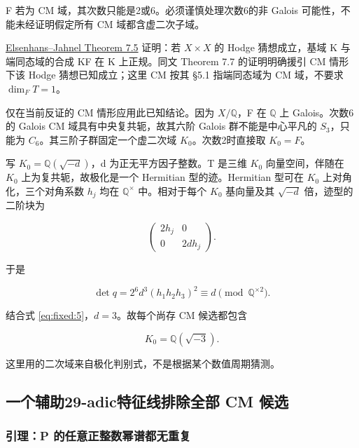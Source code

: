 \documentclass[11pt,a4paper,oneside]{ctexart}
\theoremstyle{cnplain}
\theoremstyle{definition}
\theoremstyle{remark}
\numberwithin{equation}{section}
\begin{document}
F 若为 CM 域，其次数只能是2或6。必须谨慎处理次数6的非 Galois 可能性，不能未经证明假定所有 CM 域都含虚二次子域。

\href{https://wwwuser.gwdguser.de/~jjahnel/Arbeiten/Komponentengruppe_v4f.pdf}{Elsenhans--Jahnel Theorem 7.5} 证明：若 \(X\times X\) 的 Hodge 猜想成立，基域 K 与端同态域的合成 KF 在 K 上正规。同文 Theorem 7.7 的证明明确援引 CM 情形下该 Hodge 猜想已知成立；这里 CM 按其 §5.1 指端同态域为 CM 域，不要求 \(\dim_FT=1\)。

仅在当前反证的 CM 情形应用此已知结论。因为 \(X/\mathbb Q\)，F 在 \(\mathbb Q\) 上 Galois。次数6的 Galois CM 域具有中央复共轭，故其六阶 Galois 群不能是中心平凡的 \(S_3\)，只能为 \(C_6\)。其三阶子群固定一个虚二次域 \(K_0\)。次数2时直接取 \(K_0=F\)。

写 \(K_0=\mathbb Q(\sqrt{-d})\)，d 为正无平方因子整数。T 是三维 \(K_0\) 向量空间，伴随在 \(K_0\) 上为复共轭，故极化是一个 Hermitian 型的迹。Hermitian 型可在 \(K_0\) 上对角化，三个对角系数 \(h_j\) 均在 \(\mathbb Q^\times\) 中。相对于每个 \(K_0\) 基向量及其 \(\sqrt{-d}\) 倍，迹型的二阶块为

\begin{equation}
\begin{pmatrix}2h_j&0\\0&2dh_j\end{pmatrix}.
\end{equation}

于是

\begin{equation}
\det q=2^6d^3(h_1h_2h_3)^2\equiv d
          \pmod{\mathbb Q^{\times2}}.
\end{equation}

结合式 \eqref{eq:fixed:5}，\(d=3\)。故每个尚存 CM 候选都包含

\begin{equation}
K_0=\mathbb Q(\sqrt{-3}).              \label{eq:fixed:6}
\end{equation}

这里用的二次域来自极化判别式，不是根据某个数值周期猜测。


\subsection{一个辅助29-adic特征线排除全部 CM 候选}\label{sec:fixed:4}

\subsubsection{引理：P 的任意正整数幂谱都无重复}\label{ux5f15ux7406p-ux7684ux4efbux610fux6b63ux6574ux6570ux5e42ux8c31ux90fdux65e0ux91cdux590d}
\end{document}
